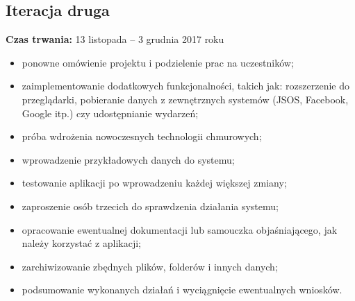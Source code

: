 \documentclass[a4paper,11pt]{article}
\begin{document}
    \subsection{Iteracja druga}
      \textbf{Czas trwania:} 13 listopada -- 3 grudnia 2017 roku
      \begin{itemize}
        \item ponowne omówienie projektu i podzielenie prac na uczestników;
        \item zaimplementowanie dodatkowych funkcjonalności, takich jak: rozszerzenie do przeglądarki, pobieranie danych z zewnętrznych systemów (JSOS, Facebook, Google itp.) czy udostępnianie wydarzeń;
        \item próba wdrożenia nowoczesnych technologii chmurowych;
        \item wprowadzenie przykładowych danych do systemu;
        \item testowanie aplikacji po wprowadzeniu każdej większej zmiany;
        \item zaproszenie osób trzecich do sprawdzenia działania systemu;
        \item opracowanie ewentualnej dokumentacji lub samouczka objaśniającego, jak należy korzystać z aplikacji;
        \item zarchiwizowanie zbędnych plików, folderów i innych danych;
        \item podsumowanie wykonanych działań i wyciągnięcie ewentualnych wniosków.
      \end{itemize}
\end{document}
